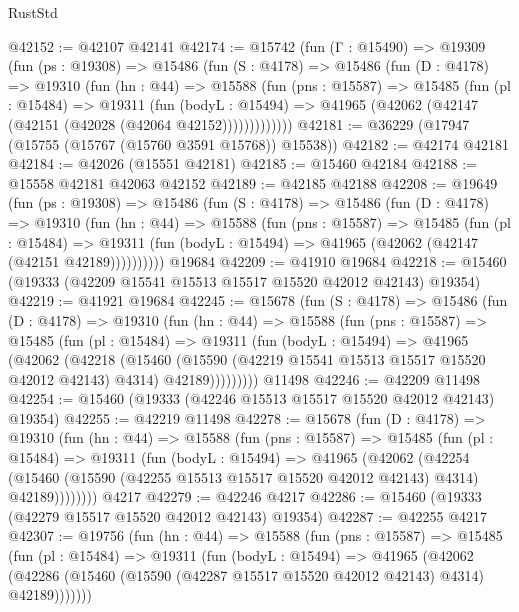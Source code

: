 \begin{lexlean}{RustStd}
\begin{coremodule}
@42152 := @42107 @42141
@42174 := @15742
    (fun (Γ : @15490) =>
    @19309
      (fun (ps : @19308) =>
      @15486
        (fun (S : @4178) =>
        @15486
          (fun (D : @4178) =>
          @19310
            (fun (hn : @44) =>
            @15588
              (fun (pns : @15587) =>
              @15485
                (fun (pl : @15484) =>
                @19311
                  (fun (bodyL : @15494) =>
                  @41965 (@42062 (@42147 (@42151 (@42028 (@42064 @42152)))))))))))))
@42181 := @36229 (@17947 (@15755 (@15767 (@15760 @3591 @15768)) @15538))
@42182 := @42174 @42181
@42184 := @42026 (@15551 @42181)
@42185 := @15460 @42184
@42188 := @15558 @42181 @42063 @42152
@42189 := @42185 @42188
@42208 := @19649
    (fun (ps : @19308) =>
    @15486
      (fun (S : @4178) =>
      @15486
        (fun (D : @4178) =>
        @19310
          (fun (hn : @44) =>
          @15588
            (fun (pns : @15587) =>
            @15485
              (fun (pl : @15484) =>
              @19311 (fun (bodyL : @15494) => @41965 (@42062 (@42147 (@42151 @42189))))))))))
    @19684
@42209 := @41910 @19684
@42218 := @15460 (@19333 (@42209 @15541 @15513 @15517 @15520 @42012 @42143) @19354)
@42219 := @41921 @19684
@42245 := @15678
    (fun (S : @4178) =>
    @15486
      (fun (D : @4178) =>
      @19310
        (fun (hn : @44) =>
        @15588
          (fun (pns : @15587) =>
          @15485
            (fun (pl : @15484) =>
            @19311
              (fun (bodyL : @15494) =>
              @41965
                (@42062
                  (@42218
                    (@15460
                      (@15590 (@42219 @15541 @15513 @15517 @15520 @42012 @42143) @4314)
                      @42189)))))))))
    @11498
@42246 := @42209 @11498
@42254 := @15460 (@19333 (@42246 @15513 @15517 @15520 @42012 @42143) @19354)
@42255 := @42219 @11498
@42278 := @15678
    (fun (D : @4178) =>
    @19310
      (fun (hn : @44) =>
      @15588
        (fun (pns : @15587) =>
        @15485
          (fun (pl : @15484) =>
          @19311
            (fun (bodyL : @15494) =>
            @41965
              (@42062
                (@42254
                  (@15460 (@15590 (@42255 @15513 @15517 @15520 @42012 @42143) @4314) @42189))))))))
    @4217
@42279 := @42246 @4217
@42286 := @15460 (@19333 (@42279 @15517 @15520 @42012 @42143) @19354)
@42287 := @42255 @4217
@42307 := @19756
    (fun (hn : @44) =>
    @15588
      (fun (pns : @15587) =>
      @15485
        (fun (pl : @15484) =>
        @19311
          (fun (bodyL : @15494) =>
          @41965
            (@42062
              (@42286 (@15460 (@15590 (@42287 @15517 @15520 @42012 @42143) @4314) @42189)))))))

\end{coremodule}
\end{lexlean}
